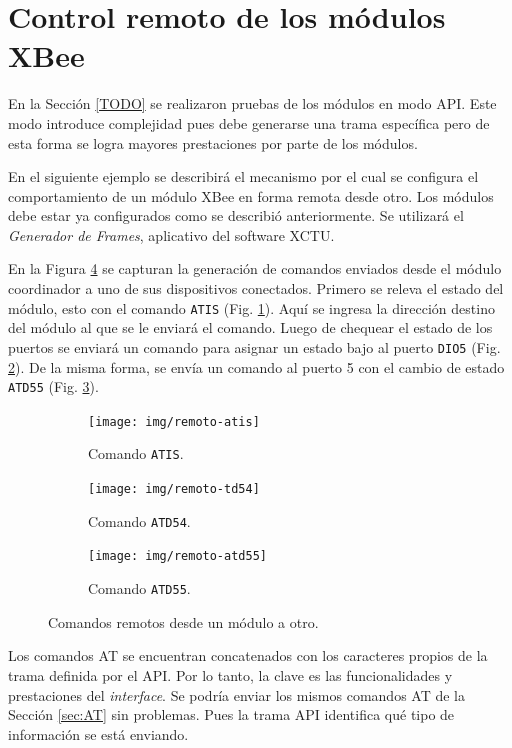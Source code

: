 \documentclass[11pt,oneside,spanish,a4paper]{article}
\begin{document}
\section{Control remoto de los módulos XBee}
\label{sec:remoto}

En la Sección \ref{TODO} se realizaron pruebas de los módulos en modo
API. Este modo introduce complejidad pues debe generarse una trama
específica pero de esta forma se logra mayores prestaciones por parte
de los módulos. 

En el siguiente ejemplo se describirá el mecanismo por el cual se
configura el comportamiento de un módulo XBee en forma remota desde
otro. Los módulos debe estar ya configurados como se describió
anteriormente. Se utilizará el \emph{Generador de Frames}, aplicativo
del software XCTU. 

En la Figura \ref{fig:remotos-dio5} se capturan la generación de
comandos enviados desde el módulo coordinador a uno de sus
dispositivos conectados. Primero se releva el estado del módulo, esto
con el comando \texttt{ATIS} (Fig. \ref{fig:remoto-atis}). Aquí se
ingresa la dirección destino del módulo al que se le enviará el
comando. Luego de chequear el estado de los puertos se enviará un
comando para asignar un estado bajo al puerto \texttt{DIO5}
(Fig. \ref{fig:remoto-atd54}). De la misma forma, se envía un comando
al puerto 5 con el cambio de estado \texttt{ATD55}
(Fig. \ref{fig:remoto-atd55}).

\begin{figure}[h]
  \centering
  \begin{subfigure}{0.3\textwidth}
    \centering
    \texttt{[image: img/remoto-atis]}
    \caption{Comando \texttt{ATIS}.}
    \label{fig:remoto-atis}
  \end{subfigure}
  \hfill
  \begin{subfigure}{0.3\textwidth}
    \centering
    \texttt{[image: img/remoto-td54]}
    \caption{Comando \texttt{ATD54}.}
    \label{fig:remoto-atd54}
  \end{subfigure}
  \hfill
  \begin{subfigure}{0.3\textwidth}
    \centering
    \texttt{[image: img/remoto-atd55]}
    \caption{Comando \texttt{ATD55}.}
    \label{fig:remoto-atd55}
  \end{subfigure}
  \caption{Comandos remotos desde un módulo a otro.}
  \label{fig:remotos-dio5}
\end{figure}

Los comandos AT se encuentran concatenados con los caracteres propios
de la trama definida por el API. Por lo tanto, la clave es las
funcionalidades y prestaciones del \textsl{interface}. Se podría enviar los
mismos comandos AT de la Sección \ref{sec:AT} sin problemas. Pues la
trama API identifica qué tipo de información se está enviando.
\end{document}
